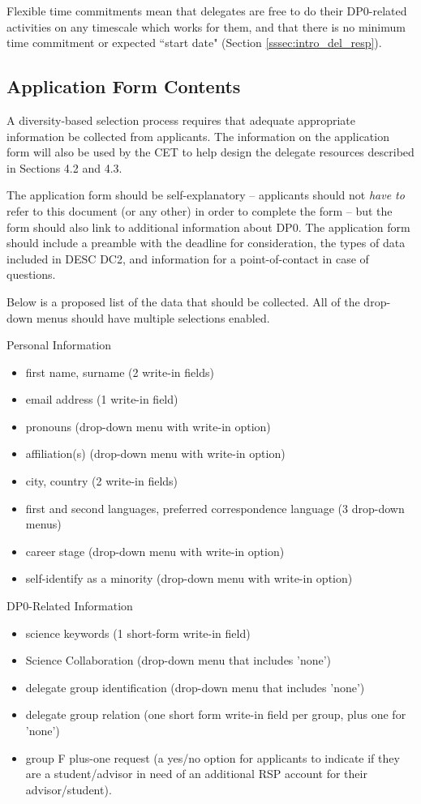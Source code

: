 \documentclass[DM,lsstdraft,authoryear,toc]{lsstdoc}
\begin{document}
Flexible time commitments mean that delegates are free to do their DP0-related activities on any timescale which works for them, and that there is no minimum time commitment or expected ``start date" (Section \ref{sssec:intro_del_resp}).


\subsection{Application Form Contents}\label{ssec:sel_form}

A diversity-based selection process requires that adequate appropriate information be collected from applicants.
The information on the application form will also be used by the CET to help design the delegate resources described in Sections 4.2 and 4.3. 

The application form should be self-explanatory -- applicants should not \emph{have to} refer to this document (or any other) in order to complete the form -- but the form should also link to additional information about DP0.
The application form should include a preamble with the deadline for consideration, the types of data included in DESC DC2, and information for a point-of-contact in case of questions.

Below is a proposed list of the data that should be collected.
All of the drop-down menus should have multiple selections enabled.

Personal Information
\begin{itemize}
\item first name, surname (2 write-in fields)
\item email address (1 write-in field)
\item pronouns (drop-down menu with write-in option)
\item affiliation(s) (drop-down menu with write-in option)
\item city, country (2 write-in fields)
\item first and second languages, preferred correspondence language (3 drop-down menus)
\item career stage (drop-down menu with write-in option)
\item self-identify as a minority (drop-down menu with write-in option)
\end{itemize}

DP0-Related Information
\begin{itemize}
\item science keywords (1 short-form write-in field)
\item Science Collaboration (drop-down menu that includes 'none')
\item delegate group identification (drop-down menu that includes 'none')
\item delegate group relation (one short form write-in field per group, plus one for 'none')
\item group F plus-one request (a yes/no option for applicants to indicate if they are a student/advisor in need of an additional RSP account for their advisor/student).
\end{itemize}
\end{document}

